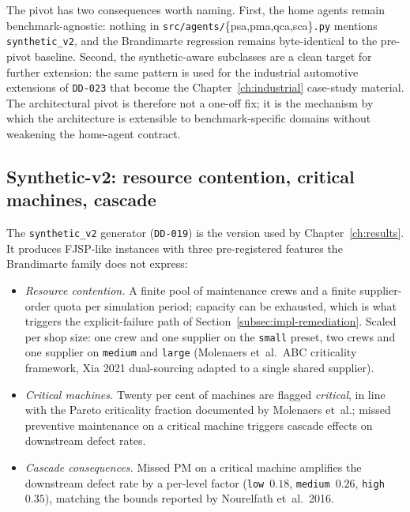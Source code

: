 The pivot has two consequences worth naming. First, the home agents
remain benchmark-agnostic: nothing in \texttt{src/agents/}\{psa,pma,qca,sca\}\texttt{.py}
mentions \texttt{synthetic\_v2}, and the Brandimarte regression remains
byte-identical to the pre-pivot baseline. Second, the synthetic-aware
subclasses are a clean target for further extension: the same pattern
is used for the industrial automotive extensions of \texttt{DD-023} that
become the Chapter~\ref{ch:industrial} case-study material. The
architectural pivot is therefore not a one-off fix; it is the
mechanism by which the architecture is extensible to benchmark-specific
domains without weakening the home-agent contract.

\subsection{Synthetic-v2: resource contention, critical machines, cascade}

The \texttt{synthetic\_v2} generator (\texttt{DD-019}) is the version
used by Chapter~\ref{ch:results}. It produces FJSP-like instances with
three pre-registered features the Brandimarte family does not express:

\begin{itemize}[leftmargin=1.4em,itemsep=0.15em]
  \item \emph{Resource contention.} A finite pool of maintenance crews
    and a finite supplier-order quota per simulation period; capacity
    can be exhausted, which is what triggers the explicit-failure path
    of Section~\ref{subsec:impl-remediation}. Scaled per shop size:
    one crew and one supplier on the \texttt{small} preset, two crews
    and one supplier on \texttt{medium} and \texttt{large} (Molenaers
    et~al.\ ABC criticality framework, Xia 2021 dual-sourcing
    adapted to a single shared supplier).
  \item \emph{Critical machines.} Twenty per cent of machines are
    flagged \emph{critical}, in line with the Pareto criticality
    fraction documented by Molenaers et~al.; missed preventive
    maintenance on a critical machine triggers cascade effects on
    downstream defect rates.
  \item \emph{Cascade consequences.} Missed PM on a critical machine
    amplifies the downstream defect rate by a per-level factor
    (\texttt{low}~$0.18$, \texttt{medium}~$0.26$, \texttt{high}~$0.35$),
    matching the bounds reported by Nourelfath et~al.\ 2016.
\end{itemize}

